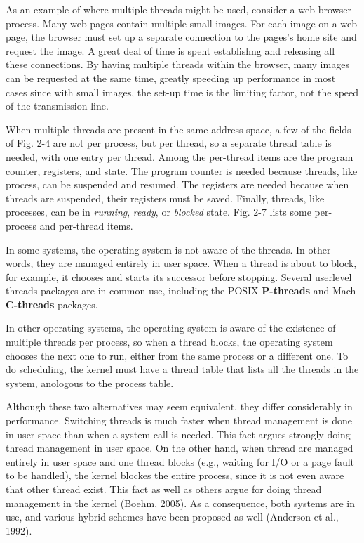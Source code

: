 \documentclass{book}
\newcommand {\kw}  [1] {\textbf{#1}}
\newcommand {\sys} [1] {\textsl{#1}}
\begin{document}
As an example of where multiple threads might be used, consider a web browser process.
Many web pages contain multiple small images.
For each image on a web page, the browser must set up a separate connection to the pages's home site and request the image.
A great deal of time is spent establishng and releasing all these connections.
By having multiple threads within the browser, many images can be requested at the same time, 
greatly speeding up performance in most cases since with small images, 
the set-up time is the limiting factor, not the speed of the transmission line.

When multiple threads are present in the same address space, a few of the fields of Fig. 2-4 are not per process, but per thread,
so a separate thread table is needed, with one entry per thread.
Among the per-thread items are the program counter, registers, and state.
The program counter is needed because threads, like process, can be suspended and resumed.
The registers are needed because when threads are suspended, their registers must be saved.
Finally, threads, like processes, can be in \sys{running}, \sys{ready}, or \sys{blocked} state.
Fig. 2-7 lists some per-process and per-thread items.

In some systems, the operating system is not aware of the threads.
In other words, they are managed entirely in user space.
When a thread is about to block, for example, it chooses and starts its successor before stopping.
Several userlevel threads packages are in common use, including the POSIX \kw{P-threads} and Mach \kw{C-threads} packages.

In other operating systems, the operating system is aware of the existence of multiple threads per process,
so when a thread blocks, the operating system chooses the next one to run, either from the same process or a different one.
To do scheduling, the kernel must have a thread table that lists all the threads in the system,
anologous to the process table.

Although these two alternatives may seem equivalent, they differ considerably in performance.
Switching threads is much faster when thread management is done in user space than when a system call is needed.
This fact argues strongly doing thread management in user space.
On the other hand, when thread are managed entirely in user space and one thread blocks (e.g., waiting for I/O or a page fault to be handled),
the kernel blockes the entire process, since it is not even aware that other thread exist.
This fact as well as others argue for doing thread management in the kernel (Boehm, 2005).
As a consequence, both systems are in use, and various hybrid schemes have been proposed as well (Anderson et al., 1992).
\end{document}
